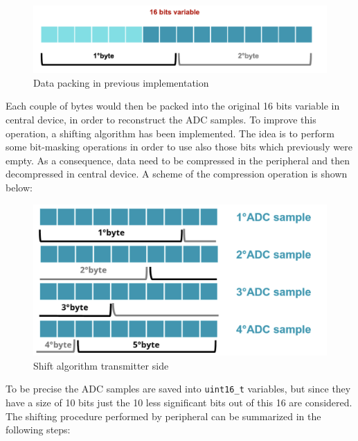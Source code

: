 \documentclass{Configuration_Files/PoliMi3i_thesis}
\begin{document}
\begin{figure}[H]
    \centering
    \includegraphics[scale=0.7]{Shift Algorithm/Screenshot 2024-07-22 at 22.31.29.png}
    \caption{Data packing in previous implementation}
    \label{pairing_procedure_3}
\end{figure}


Each couple of bytes would then be packed into the original 16 bits variable in central device, in order to reconstruct the ADC samples. To improve this operation, a shifting algorithm has been implemented. The idea is to perform some bit-masking operations in order to use also those bits which previously were empty. As a consequence, data need to be compressed in the peripheral and then decompressed in central device. A scheme of the compression operation is shown below:

\begin{figure}[H]
    \centering
    \includegraphics[scale=0.7]{Shift Algorithm/Screenshot 2024-07-22 at 22.31.36.png}
    \caption{Shift algorithm transmitter side}
    \label{pairing_procedure_4}
\end{figure}

To be precise the ADC samples are saved into \texttt{uint16\_t} variables, but since they have a size of 10 bits just the 10 less significant bits out of this 16 are considered. The shifting procedure performed by peripheral can be summarized in the following steps:
\end{document}
